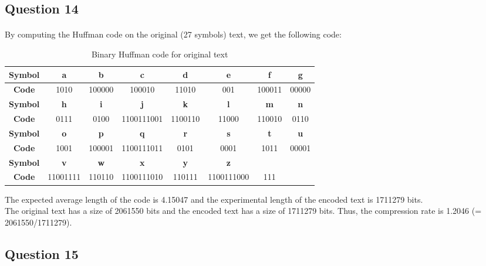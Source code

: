 \documentclass[a4paper, 11pt, oneside]{article}
\begin{document}

\subsection{Question 14}
\paragraph{}By computing the Huffman code on the original (27 symbols) text, we get the following code:
\begin{table}[H]
    \centering
    \begin{tabular}{|c|c|c|c|c|c|c|c|}
    \hline
    \textbf{Symbol} & \textbf{a} & \textbf{b} & \textbf{c} & \textbf{d} & \textbf{e} & \textbf{f} & \textbf{g} \\ \hline
    \textbf{Code}   & 1010       & 100000     & 100010     & 11010      & 001        & 100011     & 00000      \\ \hline
    \textbf{Symbol} & \textbf{h} & \textbf{i} & \textbf{j} & \textbf{k} & \textbf{l} & \textbf{m} & \textbf{n} \\ \hline
    \textbf{Code}   & 0111       & 0100       & 1100111001 & 1100110    & 11000      & 110010     & 0110       \\ \hline
    \textbf{Symbol} & \textbf{o} & \textbf{p} & \textbf{q} & \textbf{r} & \textbf{s} & \textbf{t} & \textbf{u} \\ \hline
    \textbf{Code}   & 1001       & 100001     & 1100111011 & 0101       & 0001       & 1011       & 00001      \\ \hline
    \textbf{Symbol} & \textbf{v} & \textbf{w} & \textbf{x} & \textbf{y} & \textbf{z} & \textbf{}  & \textbf{}  \\ \hline
    \textbf{Code}   & 11001111   & 110110     & 1100111010 & 110111     & 1100111000 & 111        &            \\ \hline
    \end{tabular}
    \caption{Binary Huffman code for original text}
\end{table}
The expected average length of the code is 4.15047 and the experimental length of the encoded text is 1711279 bits.\\
The original text has a size of 2061550 bits and the encoded text has a size of 1711279 bits. Thus, the compression rate is 1.2046 (= 2061550/1711279).


\subsection{Question 15}
\end{document}
